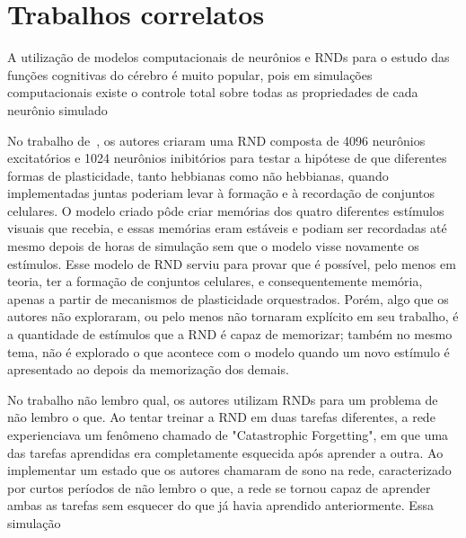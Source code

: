 \chapter{Trabalhos correlatos}






A utilização de modelos computacionais de neurônios e RNDs para o estudo das funções cognitivas do cérebro é muito popular, pois
em simulações computacionais existe o controle total sobre todas as propriedades de cada neurônio simulado


No trabalho de~\cite{}, os autores criaram uma RND composta de 4096 neurônios excitatórios e 1024 neurônios inibitórios para
testar a hipótese de que diferentes formas de plasticidade, tanto hebbianas como não hebbianas, quando implementadas juntas
poderiam levar à formação e à recordação de conjuntos celulares. O modelo criado pôde criar memórias dos quatro diferentes
estímulos visuais que recebia, e essas memórias eram estáveis e podiam ser recordadas até mesmo depois de horas de simulação sem
que o modelo visse novamente os estímulos. Esse modelo de RND serviu para provar que é possível, pelo menos em teoria, ter a
formação de conjuntos celulares, e consequentemente memória, apenas a partir de mecanismos de plasticidade orquestrados. Porém,
algo que os autores não exploraram, ou pelo menos não tornaram explícito em seu trabalho, é a quantidade de estímulos que a RND é
capaz de memorizar; também no mesmo tema, não é explorado o que acontece com o modelo quando um novo estímulo é apresentado ao
depois da memorização dos demais.

No trabalho não lembro qual, os autores utilizam RNDs para um problema de não lembro o que. Ao tentar treinar a RND em duas
tarefas diferentes, a rede experienciava um fenômeno chamado de "Catastrophic Forgetting", em que uma das tarefas aprendidas era
completamente esquecida após aprender a outra. Ao implementar um estado que os autores chamaram de sono na rede, caracterizado por
curtos períodos de não lembro o que, a rede se tornou capaz de aprender ambas as tarefas sem esquecer do que já havia aprendido
anteriormente. Essa simulação



